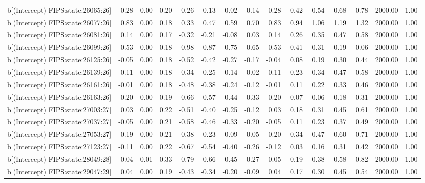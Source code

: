 \begin{table}[ht]
\begin{tabular}{rrrrrrrrrrrrrrr}
  b[(Intercept) FIPS:state:26065:26] & 0.28 & 0.00 & 0.20 & -0.26 & -0.13 & 0.02 & 0.14 & 0.28 & 0.42 & 0.54 & 0.68 & 0.78 & 2000.00 & 1.00 \\ 
  b[(Intercept) FIPS:state:26077:26] & 0.83 & 0.00 & 0.18 & 0.33 & 0.47 & 0.59 & 0.70 & 0.83 & 0.94 & 1.06 & 1.19 & 1.32 & 2000.00 & 1.00 \\ 
  b[(Intercept) FIPS:state:26081:26] & 0.14 & 0.00 & 0.17 & -0.32 & -0.21 & -0.08 & 0.03 & 0.14 & 0.26 & 0.35 & 0.47 & 0.58 & 2000.00 & 1.00 \\ 
  b[(Intercept) FIPS:state:26099:26] & -0.53 & 0.00 & 0.18 & -0.98 & -0.87 & -0.75 & -0.65 & -0.53 & -0.41 & -0.31 & -0.19 & -0.06 & 2000.00 & 1.00 \\ 
  b[(Intercept) FIPS:state:26125:26] & -0.05 & 0.00 & 0.18 & -0.52 & -0.42 & -0.27 & -0.17 & -0.04 & 0.08 & 0.19 & 0.30 & 0.44 & 2000.00 & 1.00 \\ 
  b[(Intercept) FIPS:state:26139:26] & 0.11 & 0.00 & 0.18 & -0.34 & -0.25 & -0.14 & -0.02 & 0.11 & 0.23 & 0.34 & 0.47 & 0.58 & 2000.00 & 1.00 \\ 
  b[(Intercept) FIPS:state:26161:26] & -0.01 & 0.00 & 0.18 & -0.48 & -0.38 & -0.24 & -0.12 & -0.01 & 0.11 & 0.22 & 0.33 & 0.46 & 2000.00 & 1.00 \\ 
  b[(Intercept) FIPS:state:26163:26] & -0.20 & 0.00 & 0.19 & -0.66 & -0.57 & -0.44 & -0.33 & -0.20 & -0.07 & 0.06 & 0.18 & 0.31 & 2000.00 & 1.00 \\ 
  b[(Intercept) FIPS:state:27003:27] & 0.03 & 0.00 & 0.22 & -0.51 & -0.40 & -0.25 & -0.12 & 0.03 & 0.18 & 0.31 & 0.45 & 0.61 & 2000.00 & 1.00 \\ 
  b[(Intercept) FIPS:state:27037:27] & -0.05 & 0.00 & 0.21 & -0.58 & -0.46 & -0.33 & -0.20 & -0.05 & 0.11 & 0.23 & 0.37 & 0.49 & 2000.00 & 1.00 \\ 
  b[(Intercept) FIPS:state:27053:27] & 0.19 & 0.00 & 0.21 & -0.38 & -0.23 & -0.09 & 0.05 & 0.20 & 0.34 & 0.47 & 0.60 & 0.71 & 2000.00 & 1.00 \\ 
  b[(Intercept) FIPS:state:27123:27] & -0.11 & 0.00 & 0.22 & -0.67 & -0.54 & -0.40 & -0.26 & -0.12 & 0.03 & 0.16 & 0.31 & 0.42 & 2000.00 & 1.00 \\ 
  b[(Intercept) FIPS:state:28049:28] & -0.04 & 0.01 & 0.33 & -0.79 & -0.66 & -0.45 & -0.27 & -0.05 & 0.19 & 0.38 & 0.58 & 0.82 & 2000.00 & 1.00 \\ 
  b[(Intercept) FIPS:state:29047:29] & 0.04 & 0.00 & 0.19 & -0.43 & -0.34 & -0.20 & -0.09 & 0.04 & 0.17 & 0.30 & 0.45 & 0.54 & 2000.00 & 1.00 \\ 

\end{tabular}
\end{table}
